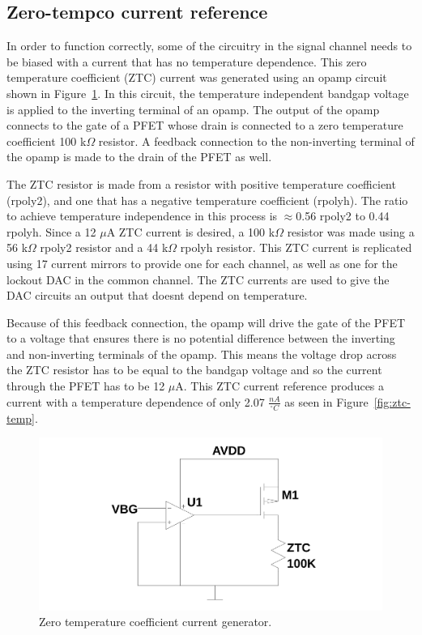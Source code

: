 \documentclass[12pt,oneside,final]{siuethesis}
\theoremstyle{definition}
\begin{document}
\subsection{Zero-tempco current reference}
\par In order to function correctly, some of the circuitry in the signal channel needs to be biased with a current that has no temperature dependence. This zero temperature coefficient (ZTC) current was generated using an opamp circuit shown in Figure~\ref{fig:ztc}. In this circuit, the temperature independent bandgap voltage is applied to the inverting terminal of an opamp. The output of the opamp connects to the gate of a PFET whose drain is connected to a zero temperature coefficient 100 k$\Omega$ resistor. A feedback connection to the non-inverting terminal of the opamp is made to the drain of the PFET as well. 
\par The ZTC resistor is made from a resistor with positive temperature coefficient (rpoly2), and one that has a negative temperature coefficient (rpolyh). The ratio to achieve temperature independence in this process is $\approx$0.56 rpoly2 to 0.44 rpolyh. Since a 12 $\mu$A ZTC current is desired, a 100 k$\Omega$ resistor was made using a 56 k$\Omega$ rpoly2 resistor and a 44 k$\Omega$ rpolyh resistor. This ZTC current is replicated using 17 current mirrors to provide one for each channel, as well as one for the lockout DAC in the common channel. The ZTC currents are used to give the DAC circuits an output that doesnt depend on temperature.
\par Because of this feedback connection, the opamp will drive the gate of the PFET to a voltage that ensures there is no potential difference between the inverting and non-inverting terminals of the opamp. This means the voltage drop across the ZTC resistor has to be equal to the bandgap voltage and so the current through the PFET has to be 12 $\mu$A. This ZTC current reference produces a current with a temperature dependence of only 2.07 $\frac{nA}{^{\circ}C}$ as seen in Figure~\ref{fig:ztc-temp}.
\begin{figure}[htbp!]
\centering
\includegraphics[scale=.3,keepaspectratio=true]{../LTspice_Drawings/ztc_iref/circuit.png} 
\caption{Zero temperature coefficient current generator.}
\label{fig:ztc}
\end{figure}
\end{document}
